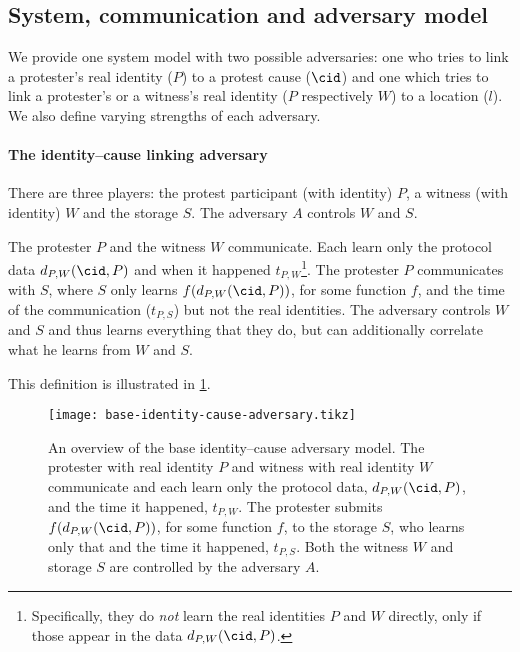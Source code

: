 \subsection{System, communication and adversary model}%
\label{adversary-model}

We provide one system model with two possible adversaries: one who tries to 
link a protester's real identity (\(P\)) to a protest cause (\(\cid\)) and one 
which tries to link a protester's or a witness's real identity (\(P\) 
respectively \(W\)) to a location (\(l\)).
We also define varying strengths of each adversary.

\paragraph{The identity--cause linking adversary}

There are three players: the protest participant (with identity) \(P\), a 
witness (with identity) \(W\) and the storage \(S\).
The adversary \(A\) controls \(W\) and \(S\).

\begin{definition}%
  \label{base-identity-cause-adversary}
  The protester \(P\) and the witness \(W\) communicate.
  Each learn only the protocol data \(d_{P,W}(\cid, P)\) and when it happened 
  \(t_{P,W}\)\footnote{%
    Specifically, they do \emph{not} learn the real identities \(P\) and \(W\) 
    directly, only if those appear in the data \(d_{P,W}(\cid, P)\).
  }.
  The protester \(P\) communicates with \(S\), where \(S\) only learns 
  \(f(d_{P,W}(\cid, P))\), for some function \(f\), and the time of the 
  communication (\(t_{P,S}\)) but not the real identities.
  The adversary controls \(W\) and \(S\) and thus learns everything that they 
  do, but can additionally correlate what he learns from \(W\) and \(S\).
\end{definition}

This definition is illustrated in \cref{fig:identity-cause-adversary}.

\begin{figure}
  \centering
  \texttt{[image: base-identity-cause-adversary.tikz]}
  \caption{\label{fig:identity-cause-adversary}%
    An overview of the base identity--cause adversary model.
    The protester with real identity \(P\) and witness with real identity \(W\) 
    communicate and each learn only the protocol data, \(d_{P,W}(\cid, P)\), 
    and the time it happened, \(t_{P,W}\).
    The protester submits \(f(d_{P,W}(\cid, P))\), for some function \(f\), to 
    the storage \(S\), who learns only that and the time it happened, 
    \(t_{P,S}\).
    Both the witness \(W\) and storage \(S\) are controlled by the adversary 
    \(A\).
  }
\end{figure}

